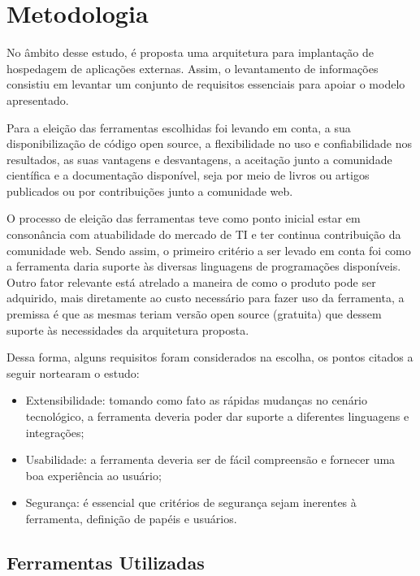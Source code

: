 



\chapter{Metodologia}\label{cap:metodologia}

No âmbito desse estudo, é proposta uma arquitetura para implantação de hospedagem de aplicações externas. Assim, o levantamento de informações consistiu em levantar um conjunto de requisitos essenciais para apoiar o modelo apresentado.

Para a eleição das ferramentas escolhidas foi levando em conta, a sua disponibilização de código open source, a flexibilidade no uso e confiabilidade nos resultados, as suas vantagens e desvantagens, a aceitação junto a comunidade científica e a documentação disponível, seja por meio de livros ou artigos publicados ou por contribuições junto a comunidade web.

O processo de eleição das ferramentas teve como ponto inicial estar em consonância com atuabilidade do mercado de TI e ter continua contribuição da comunidade web. Sendo assim, o primeiro critério a ser levado em conta foi como a ferramenta daria suporte às diversas linguagens de programações disponíveis. Outro fator relevante está atrelado a maneira de como o produto pode ser adquirido, mais diretamente ao custo necessário para fazer uso da ferramenta, a premissa é que as mesmas teriam versão open source (gratuita) que  dessem suporte às necessidades da arquitetura proposta.

Dessa forma, alguns requisitos foram considerados na escolha, os pontos citados a seguir nortearam o estudo: 

\begin{itemize}
	
	\item Extensibilidade: tomando como fato as rápidas mudanças no cenário tecnológico, a ferramenta deveria poder dar suporte a diferentes linguagens e integrações;
	\item Usabilidade: a ferramenta deveria ser de fácil compreensão e fornecer uma boa experiência ao usuário;
	\item Segurança: é essencial que critérios de segurança sejam inerentes à ferramenta, definição de papéis e usuários.
	
\end{itemize}


\section{Ferramentas Utilizadas}

